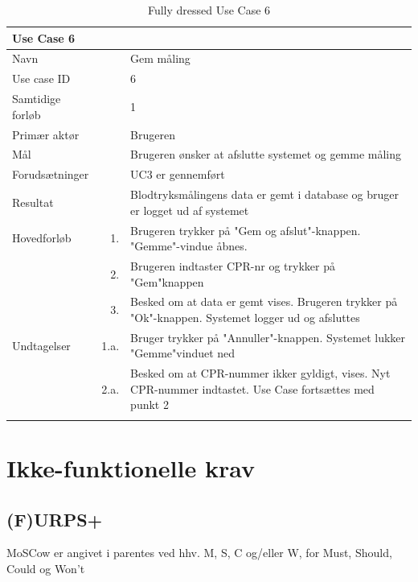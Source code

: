 \begin{longtabu} to  %
    {\large \textbf{Use Case 6}} && \\
    \toprule
    Navn &&    Gem måling\\
    Use case ID &&    6\\
    Samtidige forløb &&    1\\
    Primær aktør &&    Brugeren\\
    Mål &&    Brugeren ønsker at afslutte systemet og gemme måling\\
    Forudsætninger && UC3 er gennemført\\
    Resultat &&    Blodtryksmålingens data er gemt i database og bruger er logget ud af systemet                    \\ \midrule
    Hovedforløb &    1. &    Brugeren trykker på "Gem og afslut"\--knappen. "Gemme"\--vindue åbnes. \\  						 	
                &    2. & Brugeren indtaster CPR-nr og trykker på "Gem"\-knappen \\
                &    3. & Besked om at data er gemt vises. Brugeren trykker på "Ok"\--knappen. Systemet logger ud og afsluttes
                	\\ \midrule                
    Undtagelser &    1.a. & Bruger trykker på "Annuller"\--knappen. Systemet lukker "Gemme"\-vinduet ned\\ 
    			&	2.a. &  Besked om at CPR-nummer ikker gyldigt, vises. Nyt CPR-nummer indtastet. Use Case fortsættes med punkt 2\\ \bottomrule
    		
\caption{Fully dressed Use Case 6}
\label{UC6}
\end{longtabu}

\section{Ikke-funktionelle krav}
\subsection{(F)URPS+}
MoSCow er angivet i parentes ved hhv. M, S, C og/eller W, for Must, Should, Could og Won't\\


